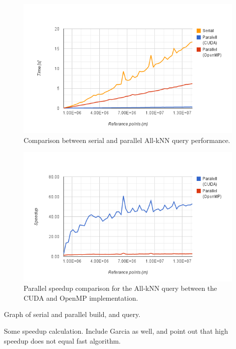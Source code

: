 \begin{figure}[ht]
    \centering
    \includegraphics[width=120mm]{../gfx/final_kd_search.png}
    \caption{Comparison between serial and parallel All-kNN query performance.}
    \label{fig:final_kd_search}
\end{figure}

\begin{figure}[ht]
    \centering
    \includegraphics[width=120mm]{../gfx/final_kd_search_speedup.png}
    \caption{Parallel speedup comparison for the All-kNN query between the CUDA and OpenMP implementation.}
    \label{fig:final_kd_search_speedup}
\end{figure}



Graph of serial and parallel build, and query.

Some speedup calculation. Include Garcia as well, and point out that high speedup does not equal fast algorithm.
